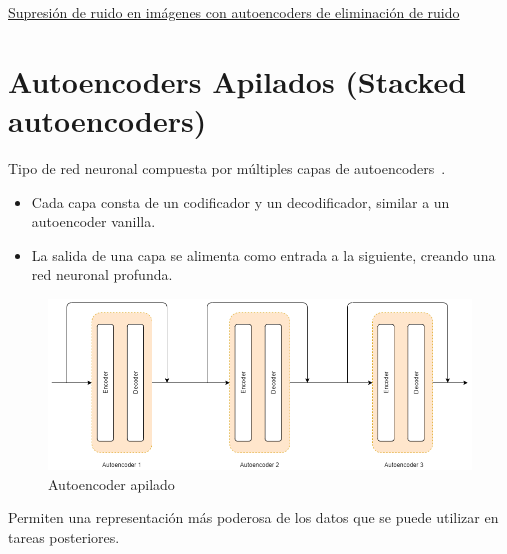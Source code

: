 \begin{exercise}
\href{https://colab.research.google.com/drive/1oRkjwRem9HBvq2557Lcc2ZsT-nR0qo30}{Supresión de ruido en imágenes con autoencoders de eliminación de ruido}

\end{exercise}


\section{Autoencoders Apilados (Stacked autoencoders)}

\begin{frame}{}
Tipo de red neuronal compuesta por múltiples capas de autoencoders~\cite{vincent2010stacked}.

\begin{itemize}
    \item Cada capa consta de un codificador y un decodificador, similar a un autoencoder vanilla.
    \item La salida de una capa se alimenta como entrada a la siguiente, creando una red neuronal profunda.
\end{itemize}

\begin{figure}
    \centering
    \includegraphics[width=.45\textwidth]{Slides/figures/02_Metodos_Generativos/nn-stack-autoencoder-1.png}
    \caption{Autoencoder apilado}
\end{figure}

Permiten una representación más poderosa de los datos que se puede utilizar en tareas posteriores.
\end{frame}

